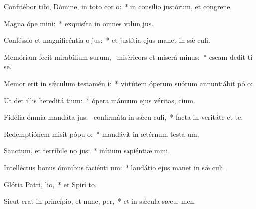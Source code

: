 \item Confitébor tibi, Dómine, in toto cor o:~* in consílio justórum, et congrene.
\item Magna ópe mini:~* exquisíta in omnes volun jus.
\item Conféssio et magnificéntia o jus:~* et justítia ejus manet in sǽ culi.
\item Memóriam fecit mirabílium surum,~\pscross{} miséricors et miserá minus:~* escam dedit ti se.
\item Memor erit in sǽculum testamén i:~* virtútem óperum suórum annuntiábit pó o:
\item Ut det illis hereditá tium:~* ópera mánuum ejus véritas,  cium.
\item Fidélia ómnia mandáta jus:~\pscross{} confirmáta in sǽcu culi,~* facta in veritáte et te.
\item Redemptiónem misit pópu o:~* mandávit in ætérnum testa um.
\item Sanctum, et terríbile no jus:~* inítium sapiéntiæ  mini.
\item Intelléctus bonus ómnibus faciénti um:~* laudátio ejus manet in sǽ culi.
\item Glória Patri,  lio,~* et Spirí to.
\item Sicut erat in princípio, et nunc,  per,~* et in sǽcula sæcu. men.
